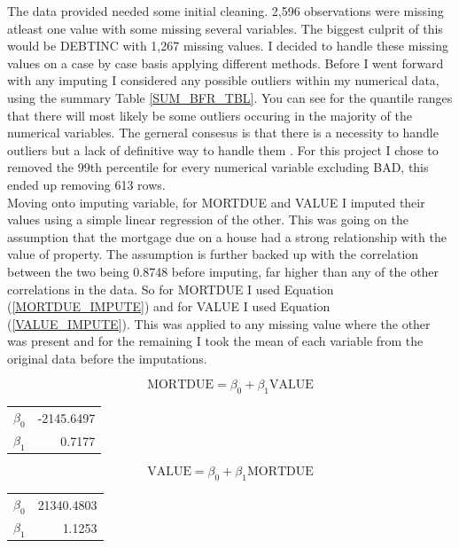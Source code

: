 The data provided needed some initial cleaning. 2,596 observations were missing atleast one value with some missing several variables. The biggest culprit of this would be DEBTINC with 1,267 missing values. I decided to handle these missing values on a case by case basis applying different methods. Before I went forward with any imputing I considered any possible outliers within my numerical data, using the summary Table \ref{SUM_BFR_TBL}. You can see for the quantile ranges that there will most likely be some outliers occuring in the majority of the numerical variables. The gerneral consesus is that there is a necessity to handle outliers but a lack of definitive way to handle them \parencite{nyitrai2019effects}. For this project I chose to removed the 99th percentile for every numerical variable excluding BAD, this ended up removing 613 rows. \\

Moving onto imputing variable, for MORTDUE and VALUE I imputed their values using a simple linear regression of the other. This was going on the assumption that the mortgage due on a house had a strong relationship with the value of property. The assumption is further backed up with the correlation between the two being 0.8748 before imputing, far higher than any of the other correlations in the data. So for MORTDUE I used Equation (\ref{MORTDUE_IMPUTE}) and for VALUE I used Equation (\ref{VALUE_IMPUTE}). This was applied to any missing value where the other was present and for the remaining I took the mean of each variable from the original data before the imputations.

\begin{equation}\label{MORTDUE_IMPUTE}
\text{MORTDUE} = \beta_{0} + \beta_{1}\text{VALUE}
\end{equation}

\begin{table}[ht]\label{MORTDUE_IMPUTE_COEFS}
	\centering
	\begin{tabular}{lr}
	\hline
	$\beta_{0}$ & -2145.6497 \\
	$\beta_{1}$ & 0.7177 \\
	\hline
	\end{tabular}
\end{table}

\begin{equation}\label{VALUE_IMPUTE}
\text{VALUE} = \beta_{0} + \beta_{1}\text{MORTDUE}
\end{equation}

\begin{table}[ht]\label{VALUE_IMPUTE_COEFS}
	\centering
	\begin{tabular}{lr}
	\hline
	$\beta_{0}$ & 21340.4803 \\
	$\beta_{1}$ & 1.1253 \\
	\hline
	\end{tabular}
\end{table}


